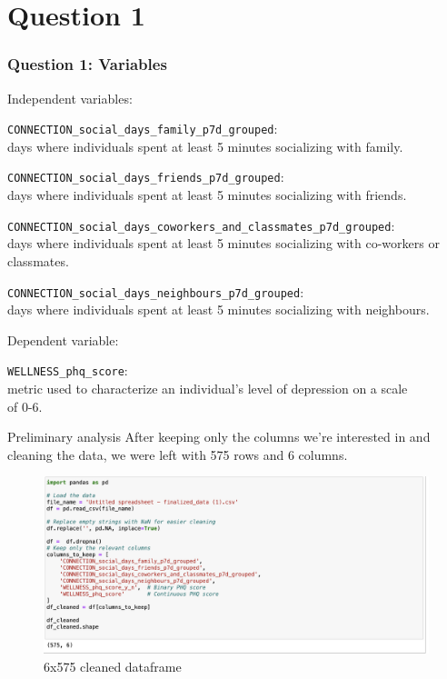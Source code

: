 \documentclass{beamer}
\begin{document}
\section{Question 1}
\begin{frame}
\frametitle{Question 1: Variables}

Independent variables:

\vspace{1em}

{\small{\tt CONNECTION\_social\_days\_family\_p7d\_grouped}:\\
days where individuals spent at least 5 minutes socializing with family.}

\vspace{0.5em}

{\small{\tt CONNECTION\_social\_days\_friends\_p7d\_grouped}:\\
days where individuals spent at least 5 minutes socializing with friends.}

\vspace{0.5em}

{\small{\tt CONNECTION\_social\_days\_coworkers\_and\_classmates\_p7d\_grouped}:\\
days where individuals spent at least 5 minutes socializing with co-workers or classmates.}

\vspace{0.5em}

{\small{\tt CONNECTION\_social\_days\_neighbours\_p7d\_grouped}:\\
days where individuals spent at least 5 minutes socializing with neighbours.}

\vspace{1.5em}

Dependent variable:

{\small{\tt WELLNESS\_phq\_score}:\\
metric used to characterize an individual's level of depression on a scale\\
of 0-6.}


\end{frame}


\begin{frame}{Preliminary analysis}
    After keeping only the columns we're interested in and cleaning the data, we were left with 575 rows and 6 columns.
\begin{figure}
    \centering
    \includegraphics[width=1\linewidth]{image.png}
    \caption{6x575 cleaned dataframe}
    \label{fig:enter-label}
\end{figure}
\end{frame}
\end{document}
